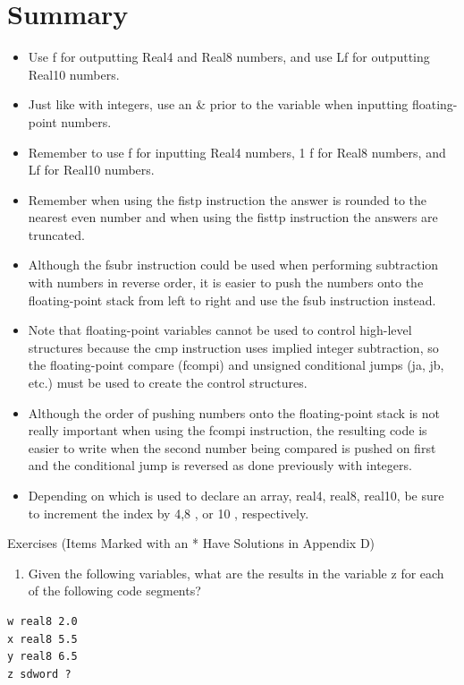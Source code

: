 \documentclass[10pt]{book}
\begin{document}
\section{Summary}
\begin{itemize}
  \item Use f for outputting Real4 and Real8 numbers, and use Lf for outputting Real10 numbers.
  \item Just like with integers, use an \& prior to the variable when inputting floating-point numbers.
  \item Remember to use f for inputting Real4 numbers, 1 f for Real8 numbers, and Lf for Real10 numbers.
  \item Remember when using the fistp instruction the answer is rounded to the nearest even number and when using the fisttp instruction the answers are truncated.
  \item Although the fsubr instruction could be used when performing subtraction with numbers in reverse order, it is easier to push the numbers onto the floating-point stack from left to right and use the fsub instruction instead.
  \item Note that floating-point variables cannot be used to control high-level structures because the cmp instruction uses implied integer subtraction, so the floating-point compare (fcompi) and unsigned conditional jumps (ja, jb, etc.) must be used to create the control structures.
  \item Although the order of pushing numbers onto the floating-point stack is not really important when using the fcompi instruction, the resulting code is easier to write when the second number being compared is pushed on first and the conditional jump is reversed as done previously with integers.
  \item Depending on which is used to declare an array, real4, real8, real10, be sure to increment the index by 4,8 , or 10 , respectively.
\end{itemize}

Exercises (Items Marked with an * Have Solutions in Appendix D)
\begin{enumerate}
  \item Given the following variables, what are the results in the variable z for each of the following code segments?
\end{enumerate}


\begin{verbatim}
w real8 2.0
x real8 5.5
y real8 6.5
z sdword ?
\end{verbatim}
\end{document}

